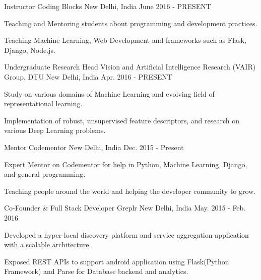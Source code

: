 \begin{cventries}
  \cventry
    {Instructor}
    {Coding Blocks}
    {New Delhi, India}
    {June 2016 - PRESENT}
    {
      \begin{cvitems}
        \item {Teaching and Mentoring students about programming and development practices.}
        \item {Teaching Machine Learning, Web Development and frameworks such as Flask, Django, Node.js.}
      \end{cvitems}
    }
  \cventry
    {Undergraduate Research Head}
    {Vision and Artificial Intelligence Research (VAIR) Group, DTU}
    {New Delhi, India}
    {Apr. 2016 - PRESENT}
    {
      \begin{cvitems}
        \item {Study on various domains of Machine Learning and evolving field  of representational learning.}
        \item {Implementation of robust, unsupervised feature descriptors, and research on  various Deep Learning problems.}
      \end{cvitems}
    }
  \cventry
    {Mentor}
    {Codementor}
    {New Delhi, India}
    {Dec. 2015 - Present}
    {
      \begin{cvitems}
        \item {Expert Mentor on Codementor for help in Python, Machine Learning, Django, and general programming.}
        \item {Teaching people around the world and helping the developer community to grow.}
      \end{cvitems} 
    }
  \cventry
    {Co-Founder \& Full Stack Developer}
    {Greplr}
    {New Delhi, India}
    {May. 2015 - Feb. 2016}
    {
      \begin{cvitems}
        \item {Developed a hyper-local discovery platform and service aggregation application with a scalable architecture.}
        \item {Exposed REST APIs to support android application using Flask(Python Framework) and Parse for Database backend and analytics.}
      \end{cvitems}
    }
\end{cventries}
